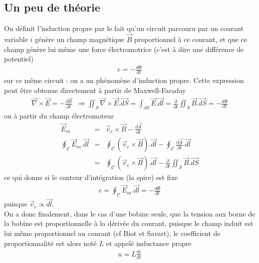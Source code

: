 \documentclass[12pt,prb,aps,epsf]{article}
\begin{document}
\subsection{Un peu de théorie}
On définit l'induction propre par le fait qu'un circuit parcouru par un courant variable $i$ génère un champ magnétique $\vec{B}$ proportionnel à ce courant, et que ce champ génère lui même une force électromotrice (c'est à dire une différence de potentiel)
\begin{eqnarray}
e = -\frac{d\Phi}{dt} 
\end{eqnarray}
sur ce même circuit : on a un phénomène d'induction propre. Cette expression peut être obtenue directement à partir de Maxwell-Faraday 
\begin{eqnarray}
\vec{\nabla}\times \vec{E} = -\frac{\partial\vec{B}}{\partial t} \;\;\Rightarrow \iint_S \vec{\nabla}\times \vec{E}. \vec{dS} = \int_{\partial S} \vec{E}.\vec{dl} = \frac{\partial}{\partial t} \iint_S \vec{B}.\vec{dS} = -\frac{d\Phi}{dt}
\end{eqnarray}
ou à partir du champ électromoteur 
\begin{eqnarray}
\vec{E}_m &=& \vec{v}_e\times \vec{B} - \frac{\partial\vec{A}}{\partial t}\\
\oint_{\mathcal{C}}\vec{E}_m.\vec{dl} &=& \oint_{\mathcal{C}}(\vec{v}_e\times \vec{B}).\vec{dl} -  \oint_{\mathcal{C}}\frac{\partial\vec{A}}{\partial t}.\vec{dl}\\
&=& \oint_{\mathcal{C}}(\vec{v}_e\times \vec{B}).\vec{dl} -  \frac{\partial}{\partial t}\iint_{\mathcal{S}}\vec{B}.\vec{dS}
\end{eqnarray}
ce qui donne si le contour d'intégration (la spire) est fixe 
\begin{eqnarray}
e = \oint_{\mathcal{C}}\vec{E}_m.\vec{dl} = - \frac{d\Phi}{dt}
\end{eqnarray}
puisque $\vec{v}_e \propto \vec{dl}$.\\

On a donc finalement, dans le cas d'une bobine seule, que la tension aux borne de la bobine est proportionnelle à la dérivée du courant, puisque le champ induit est lui même proportionnel au courant (cf Biot et Savart), le coefficient de proportionnalité est alors noté $L$ et appelé inductance propre 
\begin{eqnarray}
u = L\frac{di}{dt}
\end{eqnarray}
\end{document}
